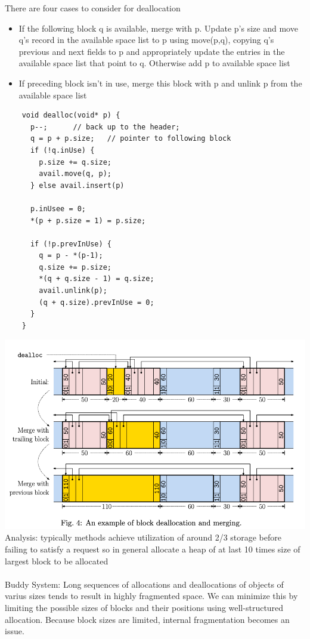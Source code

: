 \documentclass{article}
\begin{document}
  There are four cases to consider for deallocation
  \begin{itemize}[noitemsep]
    \item If the following block q is available, merge with p. Update p's size and move q's record in the available space list to p using move(p,q), copying q's previous and next fields to p and appropriately update the entries in the available space list that point to q. Otherwise add p to available space list
    \item If preceding block isn't in use, merge this block with p and unlink p from the available space list
  \end{itemize}
  \begin{lstlisting}
    void dealloc(void* p) {
      p--;      // back up to the header;
      q = p + p.size;   // pointer to following block
      if (!q.inUse) {
        p.size += q.size;
        avail.move(q, p);
      } else avail.insert(p)

      p.inUsee = 0;
      *(p + p.size = 1) = p.size;

      if (!p.prevInUse) {
        q = p - *(p-1);
        q.size += p.size;
        *(q + q.size - 1) = q.size;
        avail.unlink(p);
        (q + q.size).prevInUse = 0;
      }
    }
  \end{lstlisting}
  \includegraphics[width=\textwidth]{MemoryDeallocation}
  Analysis: typically methods achieve utilization of around 2/3 storage before failing to satisfy a request so in general allocate a heap of at last 10 times size of largest block to be allocated\\ \\
  Buddy System: Long sequences of allocations and deallocations of objects of varius sizes tends to result in highly fragmented space. We can minimize this by limiting the possible sizes of blocks and their positions using well-structured allocation. Because block sizes are limited, internal fragmentation becomes an issue. \\
\end{document}
